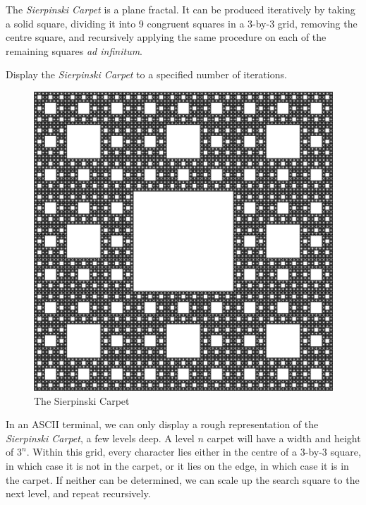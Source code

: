 

\problem The \textit{Sierpinski Carpet} is a plane fractal. It can be produced iteratively by taking a solid square, dividing
it into 9 congruent squares in a 3-by-3 grid, removing the centre square, and recursively applying the same procedure on each
of the remaining squares \textit{ad infinitum}.

Display the \textit{Sierpinski Carpet} to a specified number of iterations. 

\begin{figure}[h]
	\begin{center}
		\includegraphics[scale=0.15]{sierpinski.png}
	\end{center}
	\caption*{The Sierpinski Carpet}
	\label{fig:sierpinski_carpet}
\end{figure}

\solution In an ASCII terminal, we can only display a rough representation of the \textit{Sierpinski Carpet}, a few levels deep.
A level $n$ carpet will have a width and height of $3^n$. Within this grid, every character lies either in the centre of a 3-by-3
square, in which case it is not in the carpet, or it lies on the edge, in which case it is in the carpet. If neither can be 
determined, we can scale up the search square to the next level, and repeat recursively.

